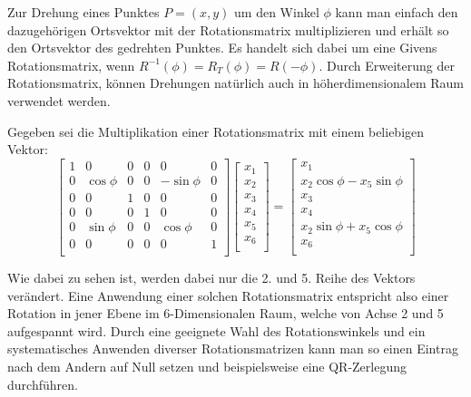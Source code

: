 Zur Drehung eines Punktes $P=(x,y)$ um den Winkel $\phi$ kann man einfach den dazugehörigen Ortsvektor mit der Rotationsmatrix multiplizieren und erhält so den Ortsvektor des gedrehten Punktes.
Es handelt sich dabei um eine Givens Rotationsmatrix, wenn $R^{-1}(\phi)=R_{T}(\phi)=R(-\phi)$.
Durch Erweiterung der Rotationsmatrix, können Drehungen natürlich auch in höherdimensionalem Raum verwendet werden. 

\begin{beispiel}
	Gegeben sei die Multiplikation einer Rotationsmatrix mit einem beliebigen Vektor:
	\begin{equation}
	\begin{bmatrix}
	1 & 0 & 0 & 0 & 0 & 0 \\
	0 & \cos\phi & 0 & 0 & -\sin\phi & 0 \\
	0 & 0 & 1 & 0 & 0 & 0 \\
	0 & 0 & 0 & 1 & 0 & 0 \\
	0 & \sin\phi & 0 & 0 & \cos\phi & 0 \\
	0 & 0 & 0 & 0 & 0 & 1 \\
	\end{bmatrix}
	\begin{bmatrix}
	x_{1}\\
	x_{2}\\
	x_{3}\\
	x_{4}\\
	x_{5}\\
	x_{6}\\
	\end{bmatrix}
	=
	\begin{bmatrix}
	x_{1}\\
	x_{2}\cos\phi-x_{5}\sin\phi\\
	x_{3}\\
	x_{4}\\
	x_{2}\sin\phi+x_{5}\cos\phi\\
	x_{6}\\
	\end{bmatrix}
	\end{equation}	
	
	Wie dabei zu sehen ist, werden dabei nur die 2. und 5. Reihe des Vektors verändert.
	Eine Anwendung einer solchen Rotationsmatrix entspricht also einer Rotation in jener Ebene im 6-Dimensionalen Raum, welche von Achse 2 und 5 aufgespannt wird.
	Durch eine geeignete Wahl des Rotationswinkels und ein systematisches Anwenden diverser Rotationsmatrizen kann man so einen Eintrag nach dem Andern auf Null setzen und beispielsweise eine QR-Zerlegung durchführen. \cite{francis:QR_Zerlegung}
\end{beispiel}

